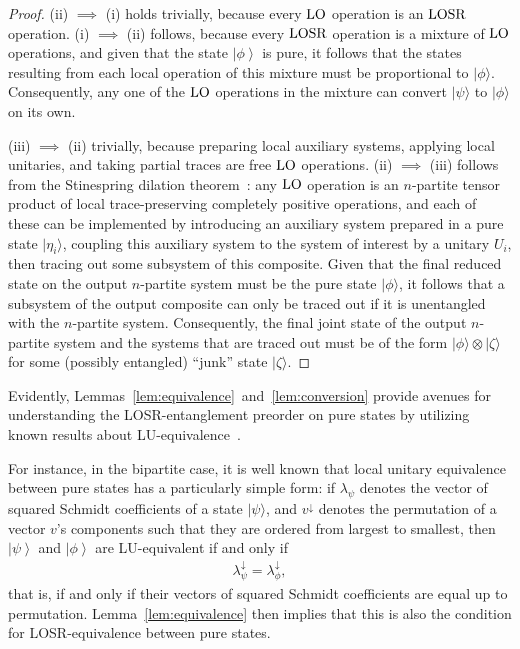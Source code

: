 \documentclass[prx,11pt,letterpaper,twocolumn,accepted=2023-11-27]{quantumarticle}
\newcommand{\ket}[1]{\left| #1 \right>}
\newcommand{\LOSR}[0]{\ifmmode\textup{\upshape LOSR}\else{\textup{\upshape LOSR}}\fi}
\newcommand{\LO}[0]{\ifmmode\textup{\upshape LO}\else{\textup{\upshape LO}}\fi}
\theoremstyle{plain}
\theoremstyle{definition}
\begin{document}
\begin{proof}
    (ii) $\implies$ (i) holds trivially, because every $\LO$ operation is an $\LOSR$ operation. (i) $\implies$ (ii) follows, because every $\LOSR$ operation is a mixture of $\LO$ operations, and given that the state $\ket{\phi}$ is pure, it follows that
     the states resulting from each local operation of this mixture must be proportional to $|\phi\rangle$. Consequently, any one of the $\LO$ operations in the mixture can convert $|\psi\rangle$ to $|\phi\rangle$ on its own.

    (iii) $\implies$ (ii) trivially, because preparing local auxiliary systems, applying local unitaries, and taking partial traces are free $\LO$ operations. (ii) $\implies$ (iii) follows from the Stinespring dilation theorem~\cite{Stinespring1955,Paulsen2003Apr}: any $\LO$ operation is an $n$-partite tensor product of local trace-preserving completely positive operations, and each of these 
    can be implemented by introducing an auxiliary system prepared in a pure state $|\eta_i\rangle $, coupling this auxiliary system to the system of interest by a unitary $U_i$, then tracing out some subsystem of this composite.
  Given that the final reduced state on the output $n$-partite system must be the pure state $|\phi\rangle$, it follows that a subsystem of the output composite can only be traced out if it is unentangled with the $n$-partite system.  Consequently, the final joint state of the output $n$-partite system and the systems that are traced out
  must be of the form $|\phi\rangle \otimes |\zeta\rangle$ for some (possibly entangled) ``junk'' state $|\zeta\rangle$.
\end{proof}

Evidently, Lemmas~\ref{lem:equivalence}~and~\ref{lem:conversion} provide avenues for understanding the LOSR-entanglement preorder on pure states by utilizing known results about LU-equivalence~\cite{Kraus2010Local,liu2012local,Acin2001puretriclassify,Barnum2001,biamonte2013tensor}. 

For instance, in the bipartite case, it is well known that local unitary equivalence between pure  states has a particularly simple form: if $\lambda_{\psi}$ denotes the vector of squared Schmidt coefficients of a state $|\psi\rangle$, and $v^{\downarrow}$ denotes the permutation of a vector $v$'s components such that they are ordered from largest to smallest, then $\ket \psi$ and $\ket \phi$ are LU-equivalent if and only if 
\begin{align}
    \label{eq:bipartite_LUequivalence}
     \lambda_{\psi}^{\downarrow} = \lambda_{\phi}^{\downarrow},
\end{align}
that is, if and only if their vectors of squared Schmidt coefficients are equal up to permutation.
Lemma~\ref{lem:equivalence} then implies that this is also the condition for LOSR-equivalence between pure states.  
\end{document}
